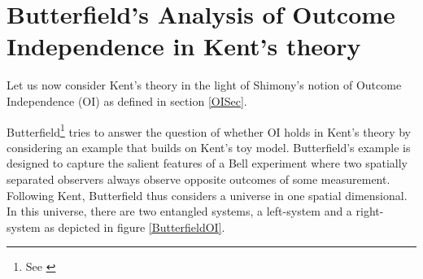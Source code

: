 

\section{Butterfield's Analysis of Outcome Independence  in Kent's theory\label{butterfieldtoy}}
Let us now consider Kent's theory in the light of Shimony's notion of Outcome Independence (OI)  as defined in section \ref{OISec}. 

Butterfield\footnote{See \cite[30-32]{Butterfield}} tries to answer the question of whether OI holds in Kent's theory by considering an example that builds on Kent's toy model. Butterfield's example is designed to capture the salient features of a Bell experiment where two spatially separated observers always observe opposite outcomes of some measurement. Following Kent, Butterfield thus considers a universe in one spatial dimensional. In this universe, there are two entangled systems, a left-system and a right-system as depicted in figure \ref{ButterfieldOI}. 

